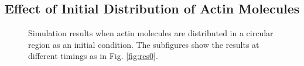 \documentclass[a4paper,12pt, oneside]{book}
\begin{document}
\subsection{Effect of Initial Distribution of Actin Molecules}
\begin{figure}[tbp]
 \caption{Simulation results when actin molecules are distributed in a circular region as an initial condition. The subfigures show the results at different timings as in Fig. \ref{fig:res0}.}
 \label{fig:res6}
\end{figure}
\end{document}
